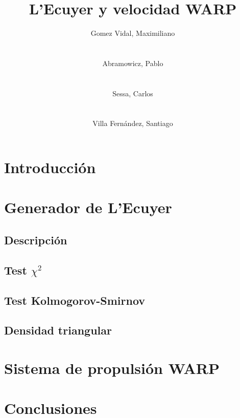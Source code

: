\documentclass{sig-alternate}
\begin{document}
\title{L'Ecuyer y velocidad WARP}


\author{
    \alignauthor
    Gomez Vidal, Maximiliano\\
     \\
    \ \\
    Abramowicz, Pablo\\
     \\
    \ \\
    \alignauthor
    Sessa, Carlos\\
     \\
    \ \\
    Villa Fern\'{a}ndez, Santiago\\
}

\maketitle

\begin{abstract}
\end{abstract}


\section{Introducci\'{o}n}\label{introduccion}

\section{Generador de L'Ecuyer}\label{generador}

\subsection{Descripci\'{o}n}

\subsection{Test $\chi^{2}$}

\subsection{Test Kolmogorov-Smirnov}

\subsection{Densidad triangular}

\section{Sistema de propulsi\'{o}n WARP}

\section{Conclusiones}
\end{document}

